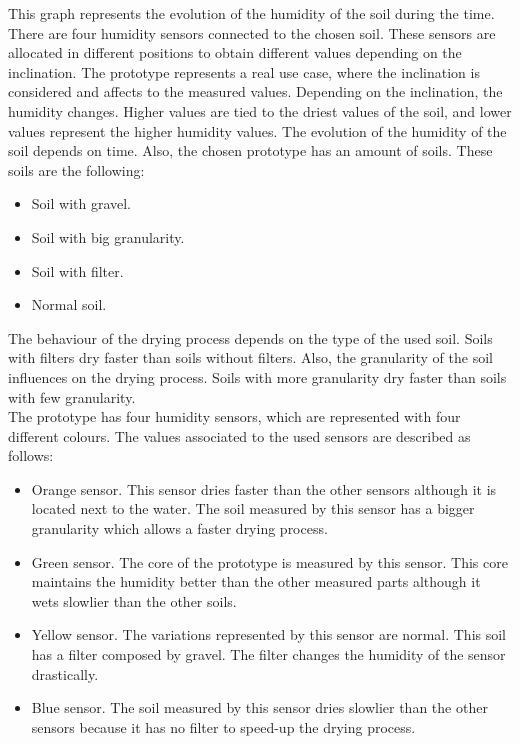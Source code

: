 This graph represents the evolution of the humidity of the soil during the time. There are four humidity sensors connected to the chosen soil. These sensors are allocated in different positions to obtain different values depending on the inclination. The prototype represents a real use case, where the inclination is considered and affects to the measured values. Depending on the inclination, the humidity changes. Higher values are tied to the driest values of the soil, and lower values represent the higher humidity values. The evolution of the humidity of the soil depends on time. Also, the chosen prototype has an amount of soils. These soils are the following:\\

\begin{itemize}

\item Soil with gravel.
\item Soil with big granularity.
\item Soil with filter.
\item Normal soil.

\end{itemize}

The behaviour of the drying process depends on the type of the used soil. Soils with filters dry faster than soils without filters. Also, the granularity of the soil influences on the drying process. Soils with more granularity dry faster than soils with few granularity.\\

The prototype has four humidity sensors, which are represented with four different colours. The values associated to the used sensors are described as follows:

\begin{itemize}

\item Orange sensor. This sensor dries faster than the other sensors although it is located next to the water. The soil measured by this sensor has a bigger granularity which allows a faster drying process.

\item Green sensor. The core of the prototype is measured by this sensor. This core maintains the humidity better than the other measured parts although it wets slowlier than the other soils.

\item Yellow sensor. The variations represented by this sensor are normal. This soil has a filter composed by gravel. The filter changes the humidity of the sensor drastically.

\item Blue sensor. The soil measured by this sensor dries slowlier than the other sensors because it has no filter to speed-up the drying process.

\end{itemize}

